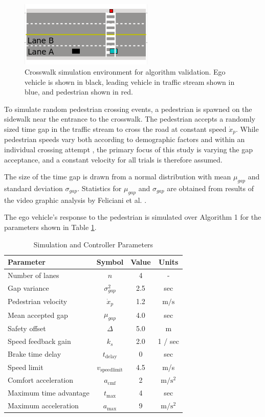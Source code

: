 \documentclass[letterpaper, 10 pt, conference]{ieeeconf}  %
\begin{document}
\begin{figure}
\centering
\includegraphics[width=2.5in]{figures/simFramework.png}
\caption{Crosswalk simulation environment for algorithm validation. Ego vehicle is shown in black, leading vehicle in traffic stream shown in blue, and pedestrian shown in red.}
\label{fig:simFramework}
\end{figure}

To simulate random pedestrian crossing events, a pedestrian is spawned  on the sidewalk near the entrance to the crosswalk. The pedestrian accepts a randomly sized time gap in the traffic stream to cross the road at constant speed $\dot{x}_p$. While pedestrian speeds vary both according to demographic factors and within an individual crossing attempt \cite{Feliciani2017}, the primary focus of this study is varying the gap acceptance, and a constant velocity for all trials is therefore assumed. 

The size of the time gap is drawn from a normal distribution with mean $\mu_{gap}$ and standard deviation $\sigma_{gap}$. Statistics for $\mu_{gap}$ and $\sigma_{gap}$ are obtained from results of the video graphic analysis by Feliciani et al. \cite{Feliciani2017}. 

The ego vehicle's response to the pedestrian is simulated over Algorithm 1 for the parameters shown in Table \ref{tb:params}.  

\begin{table}[h]
\begin{center}
\caption{Simulation and Controller Parameters}\label{tb:params}
\begin{tabular}{lccc}
Parameter & Symbol & Value & Units \\\hline\hline
Number of lanes & $n$ & 4 & - \\
Gap variance & $\sigma^2_{gap}$ & 2.5 & sec\\
Pedestrian velocity & $\dot{x}_p$ & 1.2 & $\mathrm{m/s}$ \\
Mean accepted gap & $\mu_{gap}$ & 4.0 & sec\\\hline
Safety offset       & $\Delta$ & 5.0 & m \\
Speed feedback gain & $k_s$ & 2.0 & 1 / sec\\
Brake time delay    & $t_\mathrm{delay}$ & 0 & sec \\ 
Speed limit & $v_\mathrm{speedlimit}$ & 4.5 & m/s \\
Comfort acceleration & $a_\mathrm{cmf}$ & 2 & $\mathrm{m/s^2}$ \\
Maximum time advantage & $t_\mathrm{max}$ & 4 & sec \\
Maximum acceleration & $a_\mathrm{max}$ & 9 & $\mathrm{m/s^2}$ \\\hline
\end{tabular}
\end{center}
\end{table}
\end{document}
